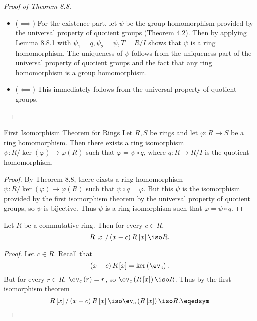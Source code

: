 \documentclass[pmath347]{subfiles}
\begin{document}
    \begin{proof}[Proof of Theorem 8.8]
        \begin{itemize}
            \item ($\implies$) For the existence part, let $\psi$ be the group homomorphism provided by the universal property of quotient groups (Theorem 4.2). Then by applying Lemma 8.8.1 with $\psi_1=q, \psi_2=\psi, T= R /I$ shows that $\psi$ is a ring homomorphism. The uniqueness of $\psi$ follows from the uniqueness part of the universal property of quotient groups and the fact that any ring homomorphism is a group homomorphism. \qqqedsym

            \item ($\impliedby$) This immediately follows from the universal property of quotient groups. \qqedsym
        \end{itemize} 
    \end{proof}

    \clearpage
    \begin{theorem}{First Isomorphism Theorem for Rings}
        Let $R, S$ be rings and let $\varphi:R\to S$ be a ring homomorphism. Then there exists a ring isomorphism $\psi:R /\ker\left( \varphi \right) \to \varphi\left( R \right)$ such that $\varphi = \psi\circ q$, where $q:R\to R /I$ is the quotient homomorphism.
    \end{theorem}
    
    \begin{proof}
        By Theorem 8.8, there eixsts a ring homomorphism $\psi: R /\ker\left( \varphi \right) \to \varphi\left( R \right)$ such that $\psi\circ q= \varphi$. But this $\psi$ is the isomorphism provided by the first isomorphism theorem by the universal property of quotient groups, so $\psi$ is bijective. Thus $\psi$ is a ring isomorphism such that $\varphi=\psi\circ q$.
    \end{proof}
    
    \begin{prop}{}
        Let $R$ be a commutative ring. Then for every $c\in R$,
        \begin{equation*}
            R\left[ x \right] / \left( x-c \right) R\left[ x \right] \iso R.
        \end{equation*}
    \end{prop}

    \begin{proof}
        Let $c\in R$. Recall that
        \begin{equation*}
            \left( x-c \right)R\left[ x \right] = \ker\left( \ev_c \right).
        \end{equation*}
        But for every $r\in R$, $\ev_c\left( r \right) = r$, so $\ev_c\left( R\left[ x \right]  \right) \iso R$. Thus by the first isomorphism theorem
        \begin{equation*}
            R\left[ x \right] / \left( x-c \right) R\left[ x \right] \iso \ev_c\left( R\left[ x \right]  \right) \iso R. \eqedsym
        \end{equation*}
    \end{proof}
\end{document}

